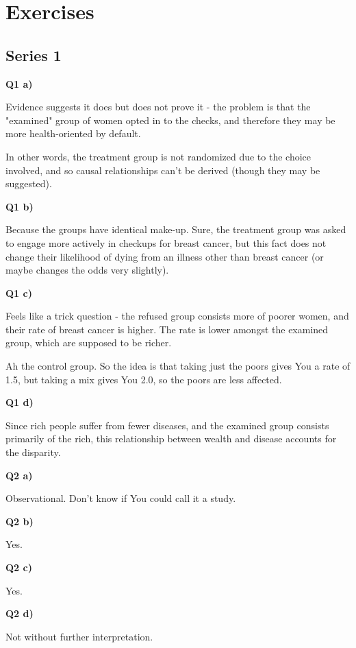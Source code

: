 \documentclass{article}
\begin{document}
\section{Exercises}
	
	\subsection{Series 1}
	
		\textbf{Q1 a)}
		
			Evidence suggests it does but does not prove it - the problem is that the "examined" group of women opted in to the checks, and therefore they may be more health-oriented by default. 
			
			In other words, the treatment group is not randomized due to the choice involved, and so causal relationships can't be derived (though they may be suggested).
			
		\textbf{Q1 b)}
		
			Because the groups have identical make-up. Sure, the treatment group was asked to engage more actively in checkups for breast cancer, but this fact does not change their likelihood of dying from an illness other than breast cancer (or maybe changes the odds very slightly).
			
		\textbf{Q1 c)}
		
			Feels like a trick question - the refused group consists more of poorer women, and their rate of breast cancer is higher. The rate is lower amongst the examined group, which are supposed to be richer.
			
			Ah the control group. So the idea is that taking just the poors gives You a rate of 1.5, but taking a mix gives You 2.0, so the poors are less affected.
			
		\textbf{Q1 d)}
		
			Since rich people suffer from fewer diseases, and the examined group consists primarily of the rich, this relationship between wealth and disease accounts for the disparity.
			
		\textbf{Q2 a)}
		
			Observational. Don't know if You could call it a study.
			
		\textbf{Q2 b)}
		
			Yes.
			
		\textbf{Q2 c)}
		
			Yes.
			
		\textbf{Q2 d)}
		
			Not without further interpretation. 
			
\end{document}
